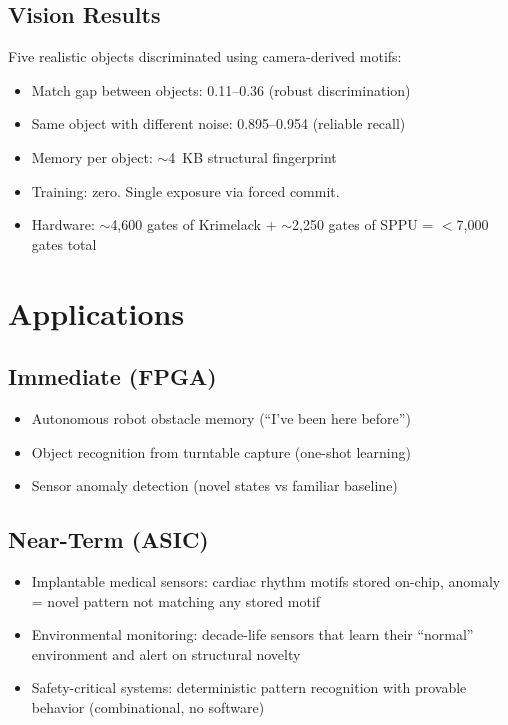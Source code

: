 \documentclass[11pt, a4paper]{article}
\begin{document}
\subsection{Vision Results}

Five realistic objects discriminated using camera-derived motifs:

\begin{itemize}[nosep]
  \item Match gap between objects: 0.11--0.36 (robust discrimination)
  \item Same object with different noise: 0.895--0.954 (reliable recall)
  \item Memory per object: $\sim$4~KB structural fingerprint
  \item Training: zero. Single exposure via forced commit.
  \item Hardware: $\sim$4,600 gates of Krimelack + $\sim$2,250 gates
        of SPPU = $<$7,000 gates total
\end{itemize}

\section{Applications}

\subsection{Immediate (FPGA)}

\begin{itemize}[nosep]
  \item Autonomous robot obstacle memory (``I've been here before'')
  \item Object recognition from turntable capture (one-shot learning)
  \item Sensor anomaly detection (novel states vs familiar baseline)
\end{itemize}

\subsection{Near-Term (ASIC)}

\begin{itemize}[nosep]
  \item Implantable medical sensors: cardiac rhythm motifs stored
        on-chip, anomaly = novel pattern not matching any stored motif
  \item Environmental monitoring: decade-life sensors that learn
        their ``normal'' environment and alert on structural novelty
  \item Safety-critical systems: deterministic pattern recognition
        with provable behavior (combinational, no software)
\end{itemize}
\end{document}
